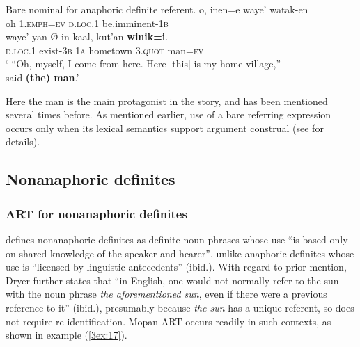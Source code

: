 \documentclass[output=paper]{langsci/langscibook}
\begin{document}
\begin{exe}
\ex\label{3ex:16}
Bare nominal for anaphoric definite referent.  
\exi{}
\gll	o,    	inen=e 			waye’           	watak-en \\
	oh     {\textsc{1.emph=ev}}	{\textsc{d.loc.1}}	be.imminent-{\textsc{1b}} \\
\glt
\exi{}
\gll	waye'           	yan-{\O}          	in     		kaal,			kut'an		{\textbf{winik=i}}. \\
	{\textsc{d.loc.1}}	exist-{\textsc{3b}}	{\textsc{1a}}	hometown		{\textsc{3.quot}}	man={\textsc{ev}} \\
\glt	` ``Oh, myself, I come from here. Here [this] is my home village,''\\said {\textbf{(the) man}}.'
\end{exe}

Here the man is the main protagonist in the story, and has been mentioned several times before.  As mentioned earlier, use of a bare referring expression occurs only when its lexical semantics support argument construal (see \citealt{contini:morava:danziger:fc} for details).


\subsection{Nonanaphoric definites}\label{3sec:32}

\subsubsection{ART for nonanaphoric definites}\label{3sec:321}

\cite[][e236]{dryer:14} defines nonanaphoric definites as definite noun phrases whose use ``is based only on shared knowledge of the speaker and hearer'', unlike anaphoric definites whose use is ``licensed by linguistic antecedents'' (ibid.).  With regard to prior mention, Dryer further states that ``in English, one would not normally refer to the sun with the noun phrase {\emph{the aforementioned sun}}, even if there were a previous reference to it'' (ibid.), presumably because {\emph{the sun}} has a unique referent, so does not require re-identification.  Mopan ART occurs readily in such contexts, as shown in example (\ref{3ex:17}).
\end{document}
